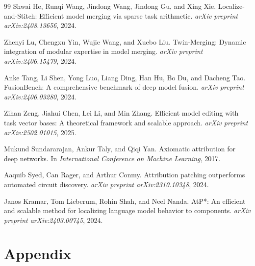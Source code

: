 \documentclass[11pt]{article}
\begin{document}
\begin{thebibliography}{99}
Shwai He, Runqi Wang, Jindong Wang, Jindong Gu, and Xing Xie.
\newblock Localize-and-Stitch: Efficient model merging via sparse task arithmetic.
\newblock \emph{arXiv preprint arXiv:2408.13656}, 2024.

Zhenyi Lu, Chengxu Yin, Wujie Wang, and Xuebo Liu.
\newblock Twin-Merging: Dynamic integration of modular expertise in model merging.
\newblock \emph{arXiv preprint arXiv:2406.15479}, 2024.

Anke Tang, Li Shen, Yong Luo, Liang Ding, Han Hu, Bo Du, and Dacheng Tao.
\newblock FusionBench: A comprehensive benchmark of deep model fusion.
\newblock \emph{arXiv preprint arXiv:2406.03280}, 2024.

Zihan Zeng, Jiahui Chen, Lei Li, and Min Zhang.
\newblock Efficient model editing with task vector bases: A theoretical framework and scalable approach.
\newblock \emph{arXiv preprint arXiv:2502.01015}, 2025.

Mukund Sundararajan, Ankur Taly, and Qiqi Yan.
\newblock Axiomatic attribution for deep networks.
\newblock In \emph{International Conference on Machine Learning}, 2017.

Aaquib Syed, Can Rager, and Arthur Conmy.
\newblock Attribution patching outperforms automated circuit discovery.
\newblock \emph{arXiv preprint arXiv:2310.10348}, 2024.

Janos Kramar, Tom Lieberum, Rohin Shah, and Neel Nanda.
\newblock AtP*: An efficient and scalable method for localizing language model behavior to components.
\newblock \emph{arXiv preprint arXiv:2403.00745}, 2024.

\end{thebibliography}










\section{Appendix}
\end{document}
